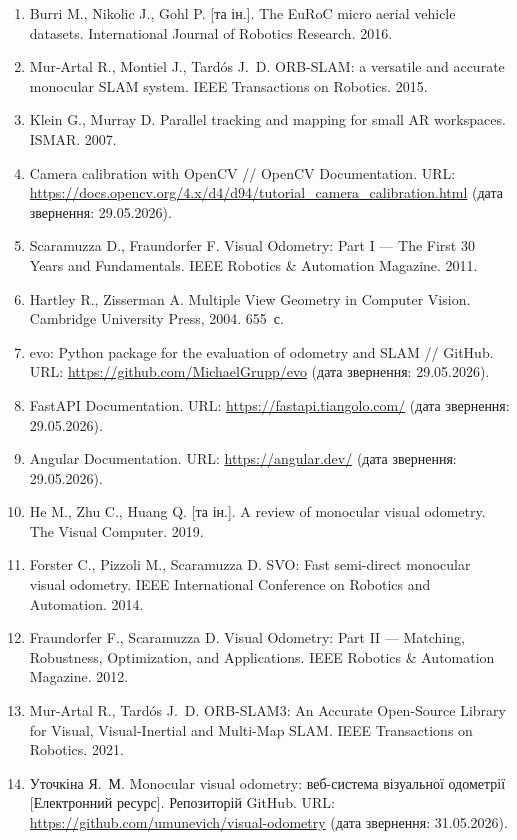 \documentclass[14pt,a4paper,openany]{extreport}
\begin{document}
\begin{enumerate}[label=\arabic*., leftmargin=*, itemsep=0.35em]

\item Burri M., Nikolic J., Gohl P. [та ін.]. The EuRoC micro aerial vehicle datasets. International Journal of Robotics Research. 2016.

\item Mur-Artal R., Montiel J., Tardós J.~D. ORB-SLAM: a versatile and accurate monocular SLAM system. IEEE Transactions on Robotics. 2015.

\item Klein G., Murray D. Parallel tracking and mapping for small AR workspaces. ISMAR. 2007.

\item Camera calibration with OpenCV // OpenCV Documentation. URL: \url{https://docs.opencv.org/4.x/d4/d94/tutorial_camera_calibration.html} (дата звернення: 29.05.2026).

\item Scaramuzza D., Fraundorfer F. Visual Odometry: Part I --- The First 30 Years and Fundamentals. IEEE Robotics \& Automation Magazine. 2011.

\item Hartley R., Zisserman A. Multiple View Geometry in Computer Vision. Cambridge University Press, 2004. 655~с.

\item evo: Python package for the evaluation of odometry and SLAM // GitHub. URL: \url{https://github.com/MichaelGrupp/evo} (дата звернення: 29.05.2026).

\item FastAPI Documentation. URL: \url{https://fastapi.tiangolo.com/} (дата звернення: 29.05.2026).

\item Angular Documentation. URL: \url{https://angular.dev/} (дата звернення: 29.05.2026).

\item He M., Zhu C., Huang Q. [та ін.]. A review of monocular visual odometry. The Visual Computer. 2019.

\item Forster C., Pizzoli M., Scaramuzza D. SVO: Fast semi-direct monocular visual odometry. IEEE International Conference on Robotics and Automation. 2014.

\item Fraundorfer F., Scaramuzza D. Visual Odometry: Part II --- Matching, Robustness, Optimization, and Applications. IEEE Robotics \& Automation Magazine. 2012.

\item Mur-Artal R., Tardós J.~D. ORB-SLAM3: An Accurate Open-Source Library for Visual, Visual-Inertial and Multi-Map SLAM. IEEE Transactions on Robotics. 2021.

\item Уточкіна Я.~М. Monocular visual odometry: веб-система візуальної одометрії [Електронний ресурс]. Репозиторій GitHub. URL: \url{https://github.com/umunevich/visual-odometry} (дата звернення: 31.05.2026).

\end{enumerate}
\end{document}
